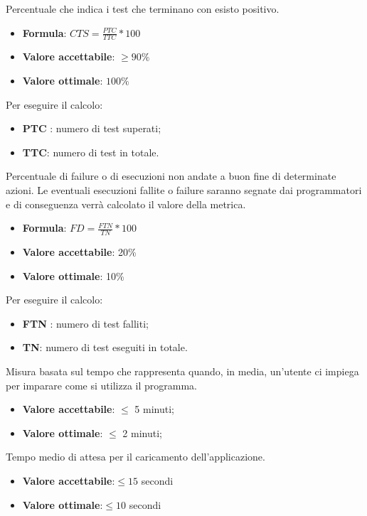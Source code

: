 Percentuale che indica i test che terminano con esisto positivo.
\begin{itemize}
    \item \textbf{Formula}: $CTS=\frac{PTC}{TTC}*100$
    \item \textbf{Valore accettabile}: $\geq90\%$
    \item \textbf{Valore ottimale}: $100\%$
\end{itemize}
Per eseguire il calcolo:
\begin{itemize}
    \item \textbf{PTC} : numero di test superati;
    \item \textbf{TTC}: numero di test in totale.
\end{itemize} 

Percentuale di failure o di esecuzioni non andate a buon fine di determinate azioni. Le
eventuali esecuzioni fallite o failure saranno segnate dai programmatori e di conseguenza verrà calcolato
il valore della metrica.
\begin{itemize}
    \item \textbf{Formula}: $FD=\frac{FTN}{TN}*100$
    \item \textbf{Valore accettabile}: 20\%
    \item \textbf{Valore ottimale}: 10\%
\end{itemize}  
Per eseguire il calcolo:
\begin{itemize}
    \item \textbf{FTN} : numero di test falliti;
    \item \textbf{TN}: numero di test eseguiti in totale.
\end{itemize}

Misura basata sul tempo che rappresenta quando, in media, un'utente ci impiega per imparare come si utilizza il programma.
\begin{itemize}
    \item \textbf{Valore accettabile}: $\leq$ 5 minuti;
    \item \textbf{Valore ottimale}: $\leq$ 2 minuti;
\end{itemize}  

Tempo medio di attesa per il caricamento dell'applicazione.
\begin{itemize}
    \item \textbf{Valore accettabile}:$\leq15$ secondi
    \item \textbf{Valore ottimale}:$\leq10$ secondi
\end{itemize} 

